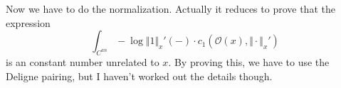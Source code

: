 \documentclass[reqno,11pt]{amsart}
\numberwithin{equation}{section}
\theoremstyle{plain}
\theoremstyle{plain}
\numberwithin{equation}{section}
\theoremstyle{remark}
\newcommand{\norm}[1]{\Vert{#1}\Vert}
\begin{document}
Now we have to do the normalization. Actually it reduces to prove that the expression
$$\int_{C^{an}}-\log \norm{1}_x'(-) \cdot c_1(\mathcal{O}(x),\norm{\cdot}_x')$$
is an constant number unrelated to $x$. By proving this, we have to use the Deligne pairing, but I haven't worked out the details though.


\end{document}

